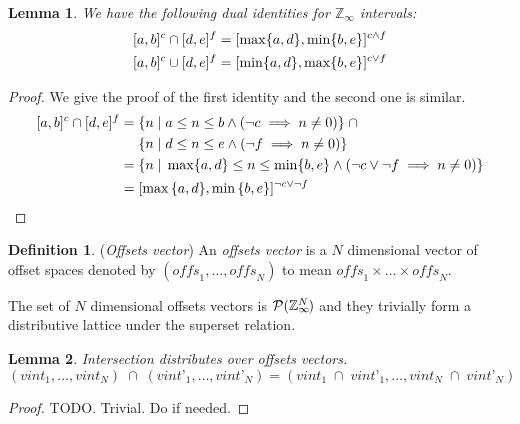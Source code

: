 \documentclass{article}
\theoremstyle{definition}
\newtheorem{defn}{Definition}
\theoremstyle{plain}
\newtheorem{lem}{Lemma}
\newcommand{\zinf}{\textnormal{$\mathbb{Z}_\infty$}}
\newcommand{\interv}[3]{\textnormal{$\lbrack#1,#2\rbrack^{#3}$}}
\newcommand{\unused}[1]{{\color{unused} #1}}
\begin{document}
\begin{lem}{}\label{lem:zinf-identities}
  We have the following dual identities for \zinf{} intervals:
%
  \begin{align*}
    \interv{a}{b}{c} \cap \interv{d}{e}{f} & =
      \interv{\max \{a,d\}}{\min \{b,e\}}{c \wedge f} \\
    \interv{a}{b}{c} \cup \interv{d}{e}{f} & =
      \interv{\min \{a,d\}}{\max \{b,e\}}{c \vee f}
  \end{align*}
\end{lem}
%
\begin{proof}
  We give the proof of the first identity and the second one is similar.
  \begin{align*}
    \interv{a}{b}{c} \cap \interv{d}{e}{f} = &
      \; \{ n \;|\; a \leq n \leq b \wedge (\neg c \implies n \neq 0) \}
      \;\cap \\
      & \; \{ n \;|\; d \leq n \leq e \wedge (\neg f \implies n \neq 0) \}
      \\
    = & \; \{ n \;|\; \max \{a,d\} \leq n \leq \min \{b,e\} \wedge (\neg c
      \vee \neg f \implies n \neq 0) \} \\
    = & \; \interv{\max{\{a,d\}}}{\min{\{b,e\}}}{\neg c \vee \neg f}
  \end{align*}
\end{proof}

\begin{defn}{(\emph{Offsets vector})}
  An \emph{offsets vector} is a $N$ dimensional vector of offset spaces denoted
  by $(\textit{offs}_1, \dots, \textit{offs}_N)$ to mean $\textit{offs}_1 \times
  \dots \times \textit{offs}_N$.

  The set of $N$ dimensional offsets vectors is
  $\mathcal{P}{(\zinf{}^{\mkern-19mu{N}})}$ and they trivially form a
  distributive lattice under the superset relation.
\end{defn}

\unused{
\begin{lem}{}\label{lem:vector-intersect}
  Intersection distributes over offsets vectors.
%
  \begin{equation*}
    (\textit{vint}_1, \dots, \textit{vint}_N) \;\cap\;
      (\textit{vint'}_1, \dots, \textit{vint'}_N)
      =
    (\textit{vint}_1 \;\cap\; \textit{vint'}_1, \dots,
     \textit{vint}_N \;\cap\; \textit{vint'}_N)
  \end{equation*}
\end{lem}
%
\begin{proof}
  TODO. Trivial. Do if needed.
\end{proof}
}
\end{document}
